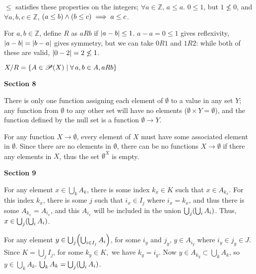 \documentclass{article}
\DeclarePairedDelimiter\prn{(}{)}
\DeclarePairedDelimiter\abs{\lvert}{\rvert}
\DeclarePairedDelimiter\crl{\{}{\}}
\newcommand{\nl}[0]{\newline}
\begin{document}
\begin{flushleft}
 \nl
$\leq$ satisfies these properties on the integers; $\forall a \in \mathbb{Z}$, $a\leq a$. $0 \leq 1$, but $1 \not\leq 0$,\nl
 and $\forall a, b, c \in \mathbb{Z}$, $\prn*{a \leq b} \wedge \prn*{b \leq c} \implies a \leq c$. \nl

  \nl
For $a, b \in \mathbb{Z}$, define $R$ as $a R b$ if $\abs*{a-b} \leq 1$. $a-a = 0 \leq 1$ gives reflexivity, $\abs{a-b} = \abs{b-a}$ gives symmetry, but we can take $0 R 1$ and $1 R 2$: while both of these are valid, $\abs{0-2} = 2 \not\leq 1$. \nl

 \nl
$X/R = \crl*{A \in \mathscr{P}(X) \; \vert \; \forall \, a,b \in A, a R b}$ \nl

\centerline{\textbf{Section 8}} 

 \nl
There is only one function assigning each element of $\emptyset$ to a value in any set $Y$; any function from $\emptyset$ to any other set will have no elements ($\emptyset \times Y = \emptyset$), and the function defined by the null set is a function $\emptyset \longrightarrow Y$. \nl

 \nl
For any function $X \rightarrow \emptyset$, every element of $X$ must have some associated element in $\emptyset$. Since there are no elements in $\emptyset$, there can be no functions $X \rightarrow \emptyset$ if there any elements in $X$, thus the set $\emptyset^X$ is empty. \nl

\centerline{\textbf{Section 9}}

 \nl
For any element $x \in \bigcup_{k} A_k$, there is some index $k_x \in K$ such that $x \in A_{k_x}$. For this index $k_x$, there is some $j$ such that $i_x \in I_j$ where $i_x = k_x$, and thus there is some $A_{k_x} = A_{i_x}$, and this $A_{i_x}$ will be included in the union $\bigcup_{j} \prn*{\bigcup_{i} A_i}$. Thus, $x \in \bigcup_{j} \prn*{\bigcup_{i} A_i}$. \nl

For any element $y \in \bigcup_{j} \prn*{\bigcup_{i \in I_j} A_i}$, for some $i_y$ and $j_y$, $y \in A_{i_y}$ where $i_y \in j_y \in J$. Since $K = \bigcup_j I_j$, for some $k_y \in K, $ we have $k_y = i_y$. Now $y \in A_{k_y} \subset \bigcup_{k} A_k$, so $y \in \bigcup_{k} A_k$. \nl \nl
$\bigcup_{k} A_k = \bigcup_{j} \prn*{\bigcup_{i} A_i}$. \nl


\end{flushleft}
\end{document}
